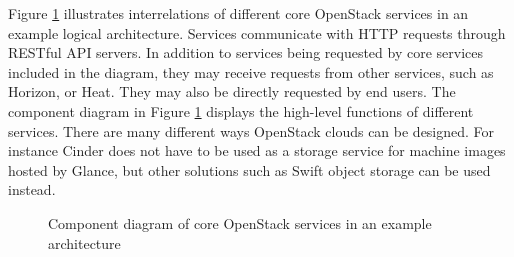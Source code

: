 Figure \ref{fig:openstack-services-component} illustrates interrelations of
different core OpenStack services in an example logical architecture. Services
communicate with HTTP requests through RESTful API servers. In addition to
services being requested by core services included in the diagram, they may
receive requests from other services, such as Horizon, or Heat. They may also
be directly requested by end users. The component diagram in Figure
\ref{fig:openstack-services-component} displays the high-level functions of
different services. There are many different ways OpenStack clouds can be
designed. For instance Cinder does not have to be used as a storage service
for machine images hosted by Glance, but other solutions such as Swift object
storage can be used instead.

\begin{figure}[t]
\centering


\caption{Component diagram of core OpenStack services in an example architecture}
\label{fig:openstack-services-component}
\end{figure}

